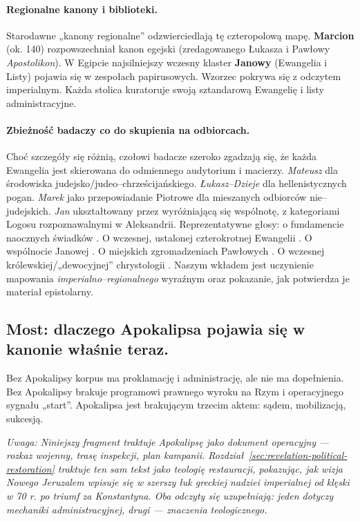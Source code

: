 \paragraph{Regionalne kanony i biblioteki.}
Starodawne „kanony regionalne” odzwierciedlają tę czteropolową mapę.
\textbf{Marcion} (ok. 140) rozpowszechniał kanon egejski (zredagowanego Łukasza i Pawłowy \textit{Apostolikon}).
W Egipcie najsilniejszy wczesny klaster \textbf{Janowy} (Ewangelia i Listy) pojawia się w zespołach papirusowych.
Wzorzec pokrywa się z odczytem imperialnym.
Każda stolica kuratoruje swoją sztandarową Ewangelię i listy administracyjne.

\paragraph{Zbieżność badaczy co do skupienia na odbiorcach.}
Choć szczegóły się różnią, czołowi badacze szeroko zgadzają się, że każda Ewangelia jest skierowana do odmiennego audytorium i macierzy.
\textit{Mateusz} dla środowiska judejsko/judeo–chrześcijańskiego.
\textit{Łukasz–Dzieje} dla hellenistycznych pogan.
\textit{Marek} jako przepowiadanie Piotrowe dla mieszanych odbiorców nie–judejskich.
\textit{Jan} ukształtowany przez wyróżniającą się wspólnotę, z kategoriami Logosu rozpoznawalnymi w Aleksandrii.
Reprezentatywne głosy: o fundamencie naocznych świadków \cite{bauckham:eyewitnesses}.
O wczesnej, ustalonej czterokrotnej Ewangelii \cite{hengel:fourgospels}.
O wspólnocie Janowej \cite{brown:johannine}.
O miejskich zgromadzeniach Pawłowych \cite{johnson:writings,meeks:urban}.
O wczesnej królewskiej/„dewocyjnej” chrystologii \cite{hurtado:lordjc}.
Naszym wkładem jest uczynienie mapowania \emph{imperialno–regionalnego} wyraźnym oraz pokazanie, jak potwierdza je materiał epistolarny.

\subsection{Most: dlaczego Apokalipsa pojawia się w kanonie właśnie teraz.}\label{subsec:bridge-why-revelation-enters-the-canon-now}
Bez Apokalipsy korpus ma proklamację i administrację, ale nie ma dopełnienia.
Bez Apokalipsy brakuje programowi prawnego wyroku na Rzym i operacyjnego sygnału „start”.
Apokalipsa jest brakującym trzecim aktem: sądem, mobilizacją, sukcesją.

\emph{Uwaga: Niniejszy fragment traktuje Apokalipsę jako dokument operacyjny — rozkaz wojenny, trasę inspekcji, plan kampanii.
Rozdział~\ref{sec:revelation-political-restoration} traktuje ten sam tekst jako teologię restauracji, pokazując, jak wizja Nowego Jeruzalem wpisuje się w szerszy łuk greckiej nadziei imperialnej od klęski w 70 r. po triumf za Konstantyna.
Oba odczyty się uzupełniają: jeden dotyczy mechaniki administracyjnej, drugi — znaczenia teologicznego.}

